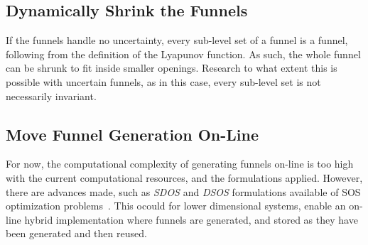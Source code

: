 \subsection{Dynamically Shrink the Funnels}

If the funnels handle no uncertainty, every sub-level set of a funnel is a
funnel, following from the definition of the Lyapunov function. As such, the whole funnel can be shrunk to fit inside smaller
openings. Research to what extent this is possible with uncertain funnels, as in
this case, every sub-level set is not necessarily invariant.

\subsection{Move Funnel Generation On-Line}

For now, the computational complexity of generating funnels on-line is too high
with the current computational resources, and the formulations applied. However,
there are advances made, such as \textit{SDOS} and \textit{DSOS} formulations
available of \ac{SOS} optimization problems~\cite{ahmadi2014dsos}. This ocould
for lower dimensional systems, enable an on-line hybrid implementation where
funnels are generated, and stored as they have been generated and then reused.




